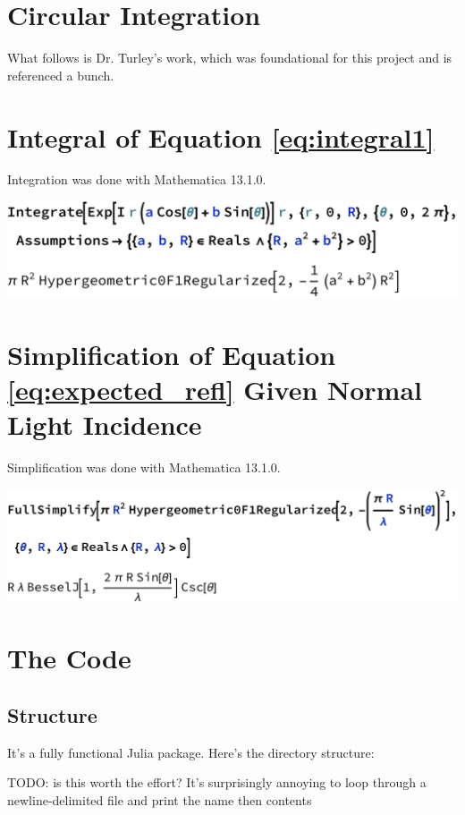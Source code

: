 \documentclass[etd,oneside,senior]{BYUPhys}
\begin{document}
\begin{appendices}

  \chapter{Circular Integration}\label{chap:circular_integration}
  
  What follows is Dr. Turley's work, which was foundational for this project and is referenced a bunch.
  
  
  
  
  
  \chapter{Integral of Equation \ref{eq:integral1}}\label{chap:integral}
  
  Integration was done with Mathematica 13.1.0.
  
  \includegraphics[width=\textwidth]{nasty-integral.pdf}
  
  
  
  \chapter{Simplification of Equation \ref{eq:expected_refl} Given Normal Light Incidence}\label{chap:airy_validation}
  
  Simplification was done with Mathematica 13.1.0.
  
  \includegraphics[width=\textwidth]{airy-simplification.pdf}
  
  
  
  \chapter{The Code}\label{chap:julia}
  
  \section{Structure}
  
  It's a fully functional Julia package. Here's the directory structure:
  
  
  
  TODO: is this worth the effort? It's surprisingly annoying to loop through a newline-delimited file and print the name then contents
  
\end{appendices}
\end{document}
